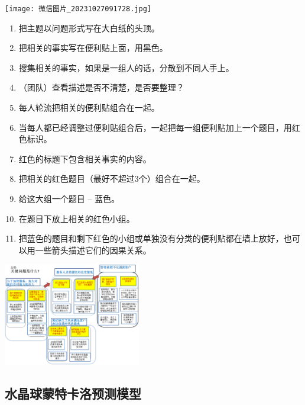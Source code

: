 \texttt{[image: 微信图片\_20231027091728.jpg]}

\begin{description}
\item[]
\begin{description}
\tightlist
\item[]
\end{description}
\end{description}

\begin{enumerate}
\tightlist
\item
  把主题以问题形式写在大白纸的头顶。
\item
  把相关的事实写在便利贴上面，用黑色。
\item
  搜集相关的事实，如果是一组人的话，分散到不同人手上。
\item
  （团队）查看描述是否不清楚，是否要整理？
\item
  每人轮流把相关的便利贴组合在一起。
\item
  当每人都已经调整过便利贴组合后，一起把每一组便利贴加上一个题目，用红色标识。
\item
  红色的标题下包含相关事实的内容。
\item
  把相关的红色题目（最好不超过3个）组合在一起。
\item
  给这大组一个题目 -- 蓝色。
\item
  在题目下放上相关的红色小组。
\item
  把蓝色的题目和剩下红色的小组或单独没有分类的便利贴都在墙上放好，也可以用一些箭头描述它们的因果关系。

\end{enumerate}


\includegraphics[width=6cm]{KJ_10.png}

\hypertarget{ux6c34ux6676ux7403ux8499ux7279ux5361ux6d1bux9884ux6d4bux6a21ux578b}{%
\subsection{水晶球蒙特卡洛预测模型}\label{ux6c34ux6676ux7403ux8499ux7279ux5361ux6d1bux9884ux6d4bux6a21ux578b}}

